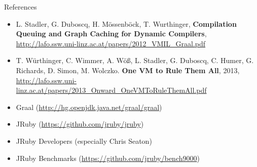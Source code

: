\documentclass[xcolor=dvipsname,handout]{beamer} %
\begin{document}
\begin{frame}{References}
\begin{itemize}
 \item L. Stadler, G. Duboscq, H. Mössenböck, T. Wurthinger, \textbf{Compilation Queuing and Graph Caching for Dynamic Compilers}, \small{\url{http://lafo.ssw.uni-linz.ac.at/papers/2012_VMIL_Graal.pdf}}
 \item T. Würthinger, C. Wimmer, A. Wöß, L. Stadler, G. Duboscq, C. Humer, G. Richards, D. Simon, M. Wolczko. \textbf{One VM to Rule Them All}, 2013, \small{\url{http://lafo.ssw.uni-linz.ac.at/papers/2013_Onward_OneVMToRuleThemAll.pdf}}
 \item Graal (\url{http://hg.openjdk.java.net/graal/graal})
 \item JRuby (\url{https://github.com/jruby/jruby})
 \item JRuby Developers (especially Chris Seaton)
 \item JRuby Benchmarks (\url{https://github.com/jruby/bench9000})
\end{itemize}
\end{frame}
\end{document}
